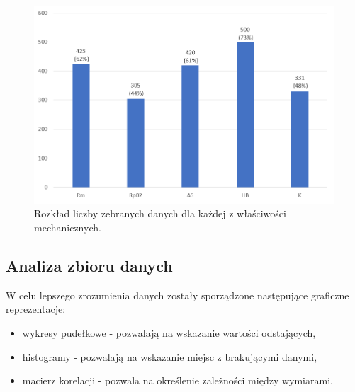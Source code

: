 \begin{figure}[ht]{}
	\centering
	\includegraphics[scale=0.5]{images/statystyki.png}
	\caption {
		 Rozkład liczby zebranych danych dla każdej z właściwości mechanicznych.
	}
	\label{fig:stats}
\end{figure}

\subsection{Analiza zbioru danych}

W celu lepszego zrozumienia danych zostały sporządzone następujące graficzne reprezentacje:
\begin{itemize}
    \item wykresy pudełkowe - pozwalają na wskazanie wartości odstających,
    \item histogramy - pozwalają na wskazanie miejsc z brakującymi danymi,
    \item macierz korelacji - pozwala na określenie zależności między wymiarami.
\end{itemize}

